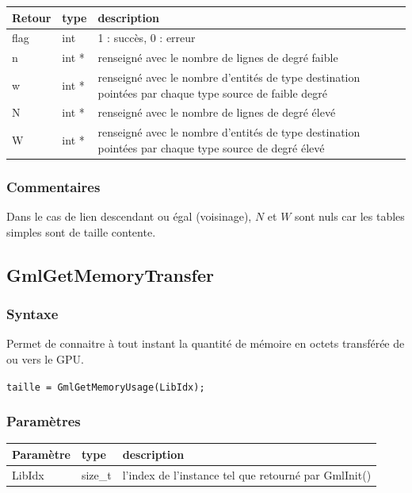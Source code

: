 \documentclass[a4paper,12pt]{article}
\begin{document}
\medskip

\begin{tabular}{|m{2cm}|m{1.5cm}|m{10.5cm}|}
\hline
Retour     & type   & description \\
\hline
flag       & int    & 1 : succès, 0 : erreur \\
\hline
n          & int *  & renseigné avec le nombre de lignes de degré faible \\
\hline
w          & int *  & renseigné avec le nombre d'entités de type destination pointées par chaque type source de faible degré \\
\hline
N          & int *  & renseigné avec le nombre de lignes de degré élevé \\
\hline
W          & int *  & renseigné avec le nombre d'entités de type destination pointées par chaque type source de degré élevé \\
\hline
\end{tabular}

\subsubsection*{Commentaires}

Dans le cas de lien descendant ou égal (voisinage), $N$ et $W$ sont nuls car les tables simples sont de taille contente.


\subsection{GmlGetMemoryTransfer}

\subsubsection*{Syntaxe}

Permet de connaitre à tout instant la quantité de mémoire en octets transférée de ou vers le GPU.

{\tt taille = GmlGetMemoryUsage(LibIdx);}

\subsubsection*{Paramètres}

\begin{tabular}{|m{2cm}|m{1.5cm}|m{10.5cm}|}
\hline
Paramètre  & type    & description \\
\hline
LibIdx     & size\_t & l'index de l'instance tel que retourné par GmlInit() \\
\hline
\end{tabular}
\end{document}
